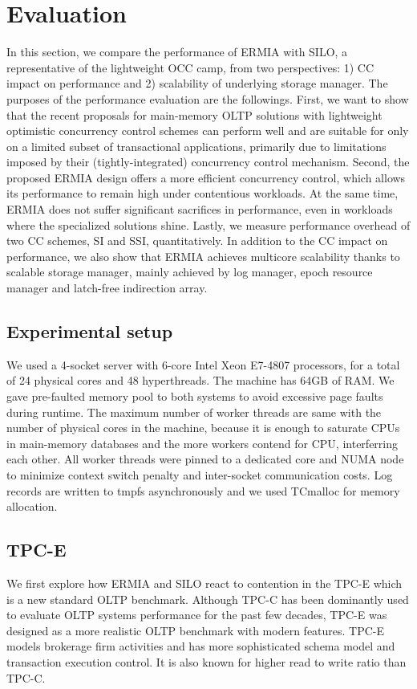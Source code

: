 
\section{Evaluation}
In this section, we compare the performance of ERMIA with SILO, a representative of the lightweight OCC camp, from two perspectives: 1) CC impact on performance and 2) scalability of underlying storage manager. 
The purposes of the performance evaluation are the followings. First, we want to show that the recent proposals for main-memory OLTP solutions with lightweight optimistic concurrency control schemes can perform well and are suitable for only on a limited subset of transactional applications, primarily due to limitations imposed by their (tightly-integrated) concurrency control mechanism. Second, the proposed ERMIA design offers a more efficient concurrency control, which allows its performance to remain high under contentious workloads. At the same time, ERMIA does not suffer significant sacrifices in performance, even in workloads where the specialized solutions shine. Lastly, we measure performance overhead of two CC schemes, SI and SSI, quantitatively. In addition to the CC impact on performance, we also show that ERMIA achieves multicore scalability thanks to scalable storage manager, mainly achieved by log manager, epoch resource manager and latch-free indirection array. 


\subsection{Experimental setup}
We used a 4-socket server with 6-core Intel Xeon E7-4807 processors, for a total of 24 physical cores and 48 hyperthreads. The machine has 64GB of RAM. We gave pre-faulted memory pool to both systems to avoid excessive page faults during runtime. The maximum number of worker threads are same with the number of physical cores in the machine, because it is enough to saturate CPUs in main-memory databases and the more workers contend for CPU, interferring each other. All worker threads were pinned to a dedicated core and NUMA node to minimize context switch penalty and inter-socket communication costs. Log records are written to tmpfs asynchronously and we used TCmalloc for memory allocation.

\subsection{TPC-E}
We first explore how ERMIA and SILO react to contention in the TPC-E which is a new standard OLTP benchmark. Although TPC-C has been dominantly used to evaluate OLTP systems performance for the past few decades, TPC-E was designed as a more realistic OLTP benchmark with modern features. TPC-E models brokerage firm activities and has more sophisticated schema model and transaction execution control. It is also known for higher read to write ratio than TPC-C. 

